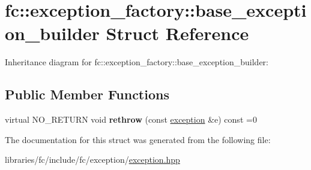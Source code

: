 \hypertarget{structfc_1_1exception__factory_1_1base__exception__builder}{}\section{fc\+:\+:exception\+\_\+factory\+:\+:base\+\_\+exception\+\_\+builder Struct Reference}
\label{structfc_1_1exception__factory_1_1base__exception__builder}


Inheritance diagram for fc\+:\+:exception\+\_\+factory\+:\+:base\+\_\+exception\+\_\+builder\+:
\subsection*{Public Member Functions}
\begin{DoxyCompactItemize}
\item 
\mbox{\label{structfc_1_1exception__factory_1_1base__exception__builder_a843cb1c8cbc9af5165ccf115166581c4}} 
virtual N\+O\+\_\+\+R\+E\+T\+U\+RN void {\bfseries rethrow} (const \mbox{\hyperlink{classfc_1_1exception}{exception}} \&e) const =0
\end{DoxyCompactItemize}


The documentation for this struct was generated from the following file\+:\begin{DoxyCompactItemize}
\item 
libraries/fc/include/fc/exception/\mbox{\hyperlink{exception_8hpp}{exception.\+hpp}}\end{DoxyCompactItemize}
